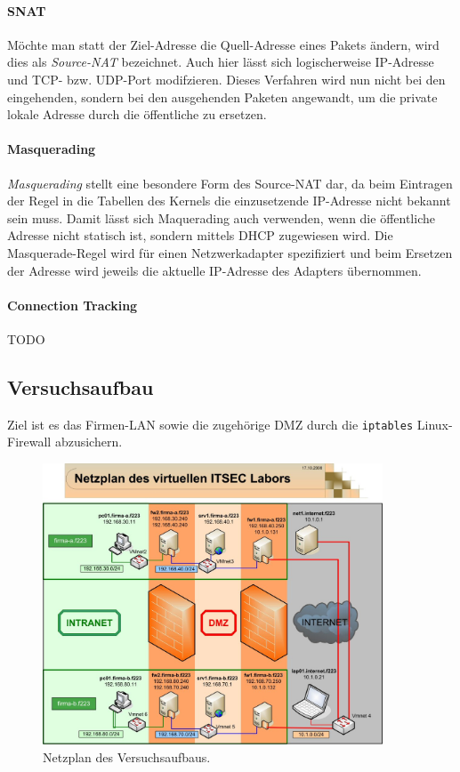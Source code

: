 \paragraph{SNAT}
Möchte man statt der Ziel-Adresse die Quell-Adresse eines Pakets ändern, wird
dies als \emph{Source-NAT} bezeichnet.
Auch hier lässt sich logischerweise IP-Adresse und TCP- bzw. UDP-Port
modifzieren.
Dieses Verfahren wird nun nicht bei den eingehenden, sondern bei den ausgehenden
Paketen angewandt, um die private lokale Adresse durch die öffentliche zu
ersetzen.

\paragraph{Masquerading}
\emph{Masquerading} stellt eine besondere Form des Source-NAT dar, da beim
Eintragen der Regel in die Tabellen des Kernels die einzusetzende IP-Adresse
nicht bekannt sein muss.
Damit lässt sich Maquerading auch verwenden, wenn die öffentliche Adresse nicht
statisch ist, sondern mittels DHCP zugewiesen wird.
Die Masquerade-Regel wird für einen Netzwerkadapter spezifiziert und beim
Ersetzen der Adresse wird jeweils die aktuelle IP-Adresse des Adapters
übernommen.

\paragraph{Connection Tracking}
TODO


\subsection{Versuchsaufbau}

Ziel ist es das Firmen-LAN sowie die zugehörige DMZ durch die
{\tt iptables} Linux-Firewall abzusichern.

\begin{figure}[h!]
  \centering
    \includegraphics[width=0.9\textwidth]{figures/Netzplan.jpg}
  \caption{Netzplan des Versuchsaufbaus.\cite{labor}}
  \label{fig.netzplan}
\end{figure}

